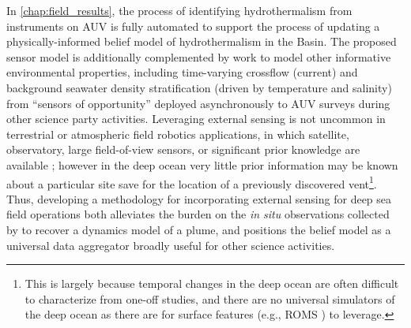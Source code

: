 In \cref{chap:field_results}, the process of identifying hydrothermalism from instruments on AUV \Sentry is fully automated to support the process of updating a physically-informed belief model of hydrothermalism in the Basin.
The proposed sensor model is additionally complemented by work to model other informative environmental properties, including time-varying crossflow (current) and background seawater density stratification (driven by temperature and salinity) from ``sensors of opportunity'' deployed asynchronously to AUV \Sentry surveys during other science party activities.
Leveraging external sensing is not uncommon in terrestrial or atmospheric field robotics applications, in which satellite, observatory, large field-of-view sensors, or significant prior knowledge are available \autocite{everett2019planning,heaney2007nonlinear,desaraju2015vision}; however in the deep ocean very little prior information may be known about a particular site save for the location of a previously discovered vent\footnote{This is largely because temporal changes in the deep ocean are often difficult to characterize from one-off studies, and there are no universal simulators of the deep ocean as there are for surface features (e.g., ROMS \autocite{moore2011regional}) to leverage.}.
Thus, developing a methodology for incorporating external sensing for deep sea field operations both alleviates the burden on the \emph{in situ} observations collected by \Sentry to recover a dynamics model of a plume, and positions the belief model as a universal data aggregator broadly useful for other science activities.


